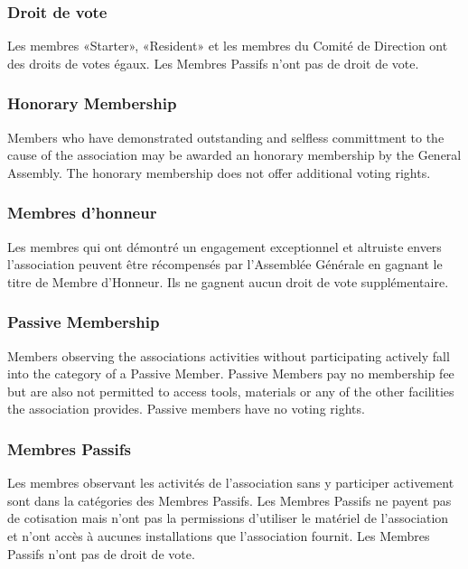 \documentclass[12pt,a4paper,oneside]{article}
\newcounter{art}
\newcommand{\english}{    \switchcolumn[0]\noindent}
\newcommand{\french}{    \switchcolumn[1]\noindent}
\begin{document}
\begin{paracol}{2}
\french
	\subsubsection{Droit de vote}
	Les membres «Starter», «Resident» et les membres du Comité de Direction ont des droits de votes égaux. Les Membres Passifs n'ont pas de droit de vote.


\english
	\subsubsection{Honorary Membership}
	Members who have demonstrated outstanding and selfless committment to the cause of the association may be awarded an honorary membership by the General Assembly. The honorary membership does not offer additional voting rights.
\french
	\subsubsection{Membres d'honneur}
	Les membres qui ont démontré un engagement exceptionnel et altruiste envers l’association peuvent être récompensés par l’Assemblée Générale en gagnant le titre de Membre d’Honneur. Ils ne gagnent aucun droit de vote supplémentaire.



\english
	\subsubsection{Passive Membership}
	Members observing the associations activities without participating actively fall into the category of a Passive Member. Passive Members pay no membership fee but are also not permitted to access tools, materials or any of the other facilities the association provides. Passive members have no voting rights.
	\vspace{0.6cm}

\french
	\subsubsection{Membres Passifs}
	Les membres observant les activités de l'association sans y participer activement sont dans la catégories des Membres Passifs. Les Membres Passifs ne payent pas de cotisation mais n'ont pas la permissions d'utiliser le matériel de l'association et n'ont accès à aucunes installations que l'association fournit. Les Membres Passifs n'ont pas de droit de vote.




\end{paracol}
\end{document}

